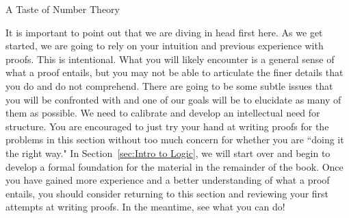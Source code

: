 \begin{section}{A Taste of Number Theory}\label{sec:baby number theory}

It is important to point out that we are diving in head first here.  As we get started, we are going to rely on your intuition and previous experience with proofs.  This is intentional. What you will likely encounter is a general sense of what a proof entails, but you may not be able to articulate the finer details that you do and do not comprehend.  There are going to be some subtle issues that you will be confronted with and one of our goals will be to elucidate as many of them as possible. We need to calibrate and develop an intellectual need for structure.  You are encouraged to just try your hand at writing proofs for the problems in this section without too much concern for whether you are ``doing it the right way." In Section~\ref{sec:Intro to Logic}, we will start over and begin to develop a formal foundation for the material in the remainder of the book. Once you have gained more experience and a better understanding of what a proof entails, you should consider returning to this section and reviewing your first attempts at writing proofs. In the meantime, see what you can do!


\end{section}
